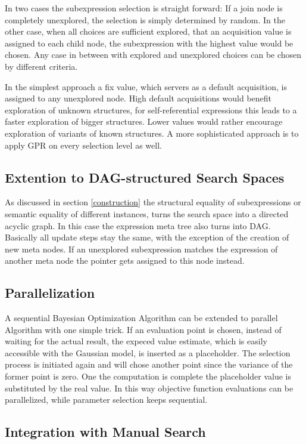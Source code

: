 \documentclass[english]{article}
\begin{document}
In two cases the subexpression selection is straight forward: If a join node is completely unexplored, the selection is simply determined by random. In the other case, when all choices are sufficient explored, that an acquisition value is assigned to each child node, the subexpression with the highest value would be chosen. Any case in between with explored and unexplored choices can be chosen by different criteria.

In the simplest approach a fix value, which servers as a default acquisition, is assigned to any unexplored node. High default acquisitions would benefit exploration of unknown structures, for self-referential expressions this leads to a faster exploration of bigger structures. Lower values would rather encourage exploration of variants of known structures.
A more sophisticated approach is to apply GPR on every selection level as well.

\subsection{Extention to DAG-structured Search Spaces}
As discussed in section \ref{construction} the structural equality of subexpressions or semantic equality of different instances, turns the search space into a directed acyclic graph. In this case the expression meta tree also turns into DAG. Basically all update steps stay the same, with the exception of the creation of new meta nodes. If an unexplored subexpression matches the expression of another meta node the pointer gets assigned to this node instead.

\subsection{Parallelization}
A sequential Bayesian Optimization Algorithm can be extended to parallel Algorithm with one simple trick. If an evaluation point is chosen, instead of waiting for the actual result, the expeced value estimate, which is easily accessible with the Gaussian model, is inserted as a placeholder. The selection process is initiated again and will chose another point since the variance of the former point is zero. One the computation is complete the placeholder value is substituted by the real value. In this way objective function evaluations can be parallelized, while parameter selection keeps sequential.

\subsection{Integration with Manual Search}
\end{document}
